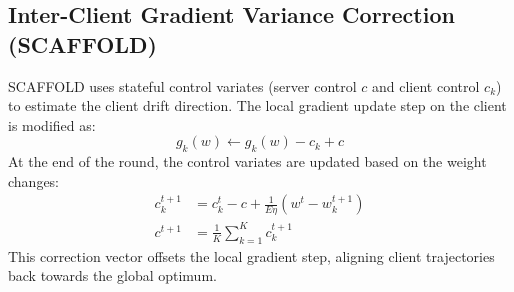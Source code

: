 \subsection{Inter-Client Gradient Variance Correction (SCAFFOLD)}
SCAFFOLD uses stateful control variates (server control $c$ and client control $c_k$) to estimate the client drift direction. The local gradient update step on the client is modified as:
\begin{equation}
    g_k(w) \leftarrow g_k(w) - c_k + c
\end{equation}
At the end of the round, the control variates are updated based on the weight changes:
\begin{align}
    c_k^{t+1} &= c_k^t - c + \frac{1}{E \eta} (w^t - w_k^{t+1}) \\
    c^{t+1} &= \frac{1}{K} \sum_{k=1}^K c_k^{t+1}
\end{align}
This correction vector offsets the local gradient step, aligning client trajectories back towards the global optimum.

